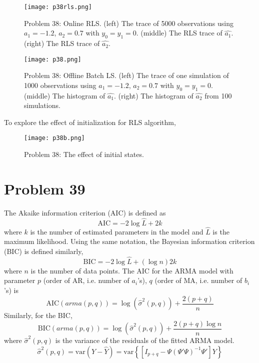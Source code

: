 \documentclass[a4paper, 11pt]{article}
\begin{document}
\begin{figure}
	\begin{center}
		\texttt{[image: p38rls.png]}
		\caption{Problem 38: Online RLS. (left) The trace of 5000 observations using $a_1 = -1.2$, $a_2=0.7$ with $y_0 = y_1 = 0$. (middle) The RLS trace of $\hat{a_1}$. (right) The RLS trace of $\hat{a_2}$.}
	\end{center}
\end{figure}


\begin{figure}
	\begin{center}
		\texttt{[image: p38.png]}
		\caption{Problem 38: Offline Batch LS. (left) The trace of one simulation of 1000 observations using $a_1 = -1.2$, $a_2=0.7$ with $y_0 = y_1 = 0$. (middle) The histogram of $\hat{a_1}$. (right) The histogram of $\hat{a_2}$ from 100 simulations. }
	\end{center}
\end{figure}


To explore the effect of initialization for RLS algorithm, 

\begin{figure}
	\begin{center}
		\texttt{[image: p38b.png]}
		\caption{Problem 38: The effect of initial states. }
	\end{center}
\end{figure}


 

\section*{Problem 39}

The Akaike information criterion (AIC) is defined as 
\begin{equation}
\text{AIC} = -2\log{\hat{L}} + 2k
\end{equation}
where $k$ is the number of estimated parameters in the model and $\hat{L}$ is the maximum likelihood. Using the same notation, the Bayesian information criterion (BIC) is defined similarly, 
\begin{equation}
\text{BIC} = -2\log{\hat{L}} + (\log{n})2k
\end{equation}
where $n$ is the number of data points. The AIC for the ARMA model with parameter $p$ (order of AR, i.e. number of $a_i$'s), $q$ (order of MA, i.e. number of $b_i$'s) is 
\begin{equation}
\text{AIC}(arma(p,q)) = \log{(\hat{\sigma}^2(p,q))} + \frac{2(p+q)}{n}
\end{equation}
Similarly, for the BIC, 
\begin{equation}
\text{BIC}(arma(p,q)) = \log{(\hat{\sigma}^2(p,q))} + \frac{2(p+q)\log{n}}{n}
\end{equation}
where $\hat{\sigma}^2(p,q)$ is the variance of the residuals of the fitted ARMA model.
\begin{equation}
\hat{\sigma}^2(p,q) = \text{var}(Y - \hat{Y}) = \text{var}\left\{ \left[ I_{p+q} - \Psi (\Psi ' \Psi)^{-1} \Psi ' \right]Y \right\}
\end{equation}
\end{document}
